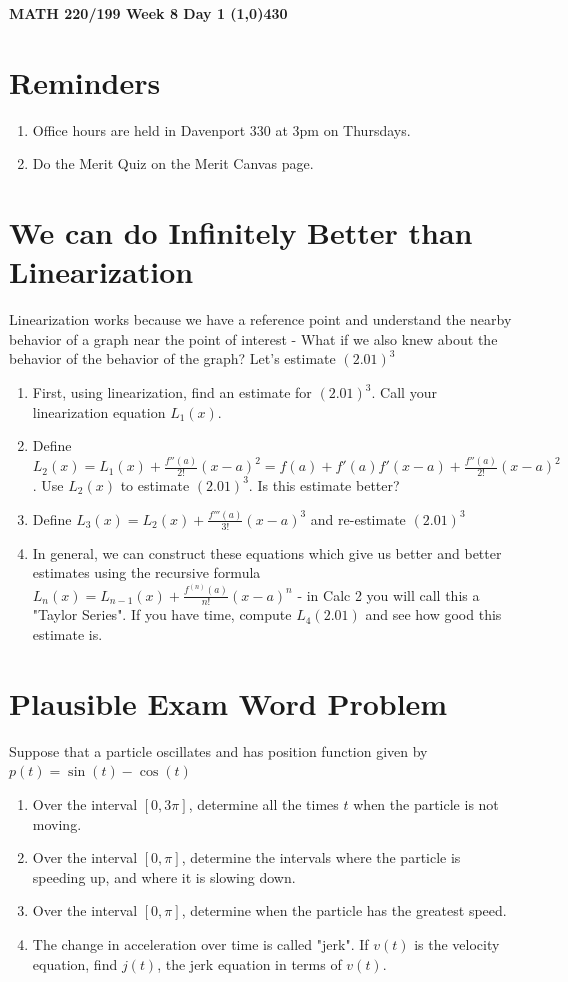 \documentclass{article}
\begin{document}
\begin{center}
 \LARGE\bfseries MATH 220/199 Week 8 Day 1
 \line(1,0){430}
\end{center}
\section*{Reminders}
\begin{enumerate}
    \item Office hours are held in Davenport 330 at 3pm on Thursdays.
    \item Do the Merit Quiz on the Merit Canvas page.
\end{enumerate}
\section*{We can do Infinitely Better than Linearization}
Linearization works because we have a reference point and understand the nearby behavior of a graph near the point of interest - What if we also knew about the behavior of the behavior of the graph? Let's estimate $(2.01)^3$
\begin{enumerate}
    \item First, using linearization, find an estimate for $(2.01)^3$. Call your linearization equation $L_1(x)$.
    \vfill
    \item Define $L_2(x) = L_1(x)+\frac{f''(a)}{2!}(x-a)^2 = f(a)+f'(a)f'(x-a)+\frac{f''(a)}{2!}(x-a)^2$. Use $L_2(x)$ to estimate $(2.01)^3$. Is this estimate better?
    \vfill
    \item Define $L_3(x) = L_2(x)+\frac{f'''(a)}{3!}(x-a)^3$ and re-estimate $(2.01)^3$
    \vfill
    \item In general, we can construct these equations which give us better and better estimates using the recursive formula $L_n(x) = L_{n-1}(x)+\frac{f^{(n)}(a)}{n!}(x-a)^n$ - in Calc 2 you will call this a "Taylor Series". If you have time, compute $L_4(2.01)$ and see how good this estimate is.
    \vfill
\end{enumerate}
\newpage
\section*{Plausible Exam Word Problem}
Suppose that a particle oscillates and has position function given by $p(t) = \sin(t)-\cos(t)$
\begin{enumerate}
    \item Over the interval $[0, 3\pi]$, determine all the times $t$ when the particle is not moving.
    \vfill
    \item Over the interval $[0, \pi]$, determine the intervals where the particle is speeding up, and where it is slowing down.
    \vfill
    \item Over the interval $[0, \pi]$, determine when the particle has the greatest speed.
    \vfill
    \item The change in acceleration over time is called 
    "jerk". If $v(t)$ is the velocity equation, find $j(t)$, the jerk equation in terms of $v(t)$.
    \vfill
\end{enumerate}
\end{document}
